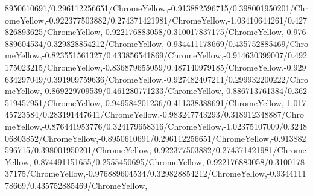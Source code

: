 {\begin{tikzternal}
{8950610691/0.296112256651/ChromeYellow,-0.913882596715/0.398001950201/ChromeYellow,-0.922377503882/0.274371421981/ChromeYellow,-1.03410644261/0.427826893625/ChromeYellow,-0.922176883058/0.310017837175/ChromeYellow,-0.976889604534/0.329828854212/ChromeYellow,-0.934411178669/0.435752885469/ChromeYellow,-0.823551561327/0.433856541869/ChromeYellow,-0.914630399007/0.492175023215/ChromeYellow,-0.836879655059/0.487140979185/ChromeYellow,-0.929634297049/0.391909759636/ChromeYellow,-0.927482407211/0.299932200222/ChromeYellow,-0.869229709539/0.461280771233/ChromeYellow,-0.886713761384/0.362519457951/ChromeYellow,-0.949584201236/0.411338388691/ChromeYellow,-1.01745723584/0.283191447641/ChromeYellow,-0.983247743293/0.318912348887/ChromeYellow,-0.876441953776/0.324179658316/ChromeYellow,-1.02375107009/0.324806803852/ChromeYellow,-0.8950610691/0.296112256651/ChromeYellow,-0.913882596715/0.398001950201/ChromeYellow,-0.922377503882/0.274371421981/ChromeYellow,-0.874491151655/0.2555450695/ChromeYellow,-0.922176883058/0.310017837175/ChromeYellow,-0.976889604534/0.329828854212/ChromeYellow,-0.934411178669/0.435752885469/ChromeYellow,
}
\end{tikzternal}}
